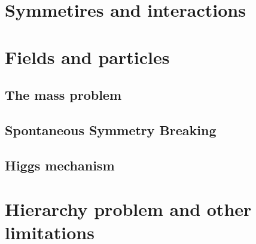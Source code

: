 \section{Symmetires and interactions}
\label{sec:symm}

\section{Fields and particles}
\label{sec:fields}

\subsection{The mass problem}
\label{sec:mass}

\subsection{Spontaneous Symmetry Breaking}
\label{sec:SSB}

\subsection{Higgs mechanism}
\label{sec:higgs}

\section{Hierarchy problem and other limitations}
\label{sec:hier}

